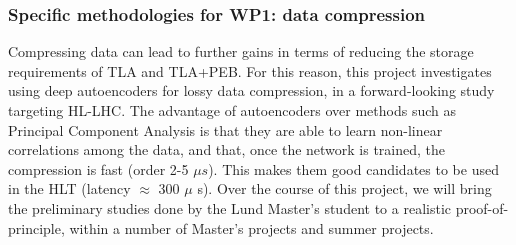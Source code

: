 \subsubsection{Specific methodologies for WP1: data compression}

Compressing data can lead to further gains in terms of reducing the storage requirements of TLA and TLA+PEB. 
For this reason, this project investigates using deep autoencoders for lossy data compression, in a forward-looking study targeting HL-LHC. 
The advantage of autoencoders over methods such as Principal Component Analysis is that they are able to learn non-linear correlations among the data, 
and that, once the network is trained, the compression is fast (order 2-5 $\mu s$).
This makes them good candidates to be used in the HLT (latency $\approx$ 300 $\mu$ s). 
Over the course of this project, we will bring the preliminary studies done by the Lund Master's student to a realistic proof-of-principle, within a number of Master's projects and summer projects. 


